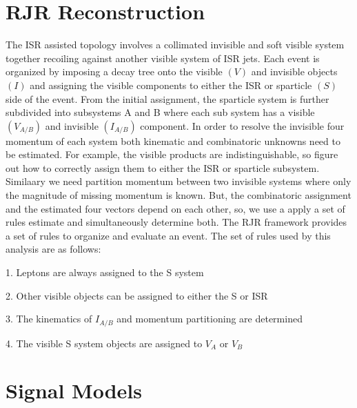 \section{ RJR Reconstruction}
 The ISR assisted topology involves a collimated invisible and soft visible system together recoiling against another visible system of ISR jets. Each event is organized by imposing a decay tree onto the visible $(V)$ and invisible objects $(I)$ and assigning the visible components to either the ISR or sparticle $(S)$ side of the event. From the initial assignment, the sparticle system is further subdivided into subsystems A and B where each sub system has a visible $(V_{A/B})$ and invisible  $(I_{A/B})$ component. In order to resolve the invisible four momentum of each system both kinematic and combinatoric unknowns need to be estimated. For example, the visible products are indistinguishable, so figure out how to correctly assign them to either the ISR or sparticle subsystem. Similaary we need partition momentum between two invisible systems where only the magnitude of missing momentum is known. But, the combinatoric assignment and the estimated four vectors depend on each other, so, we use a apply a set of rules estimate and simultaneously determine both.  The RJR framework provides a set of rules to organize and evaluate an event. The set of rules used by this analysis are as follows:
\begin{list}
\item[1.] Leptons are always assigned to the S system
\item[2.] Other visible objects can be assigned to either the S or ISR
\item[3.] The kinematics of $I_{A/B}$ and momentum partitioning are determined
\item[4.] The visible S system objects are assigned to $V_A$ or $V_B$
\end{list}




\section{}

\section{Signal Models}
